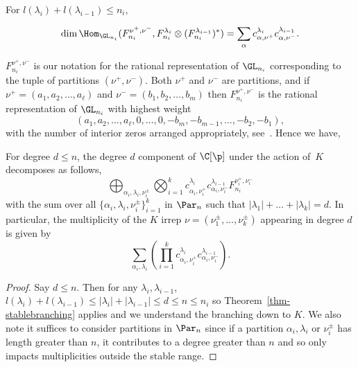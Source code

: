 \begin{thm}  \label{thm-stablebranching}

For $l(\lambda_i) + l(\lambda_{i-1}) \leq n_i$,

$$\dim \Hom_{\GL_{n_i}}(F^{\nu^+, \nu^-}_{n_i}, F^{\lambda_i}_{n_i} \otimes (F^{\lambda_{i-1}}_{n_i})^*) = \sum_\alpha c^{\lambda_i}_{\alpha, \nu^+} c^{\lambda_{i-1}}_{\alpha, \nu^-}.$$


\end{thm}

$F_{n_i}^{\nu^+, \nu^-}$ is our notation for the rational representation of $\GL_{n_i}$ corresponding to the tuple of partitions $(\nu^+, \nu^-)$. Both $\nu^+$ and $\nu^-$ are partitions, and if $\nu^+ = (a_1,a_2,\dots,a_\ell)$ and $\nu^- = (b_1, b_2, \dots, b_m)$ then $F_{n_i}^{\nu^+, \nu^-}$ is the rational representation of $\GL_{n_i}$ with highest weight $$(a_1,a_2,\dots,a_\ell,0,\dots,0,-b_m,-b_{m-1},\dots,-b_2,-b_1),$$ with the number of interior zeros arranged appropriately, see~\cite{STEMBRIDGE198779}. Hence we have,

\begin{thm}
    For degree $d \leq n$, the degree $d$ component of $\C[\p]$ under the action of~$K$ decomposes as follows,
    $$\bigoplus_{\alpha_i, \lambda_i, \nu_i^\pm}\bigotimes_{i=1}^k
    c^{\lambda_i}_{\alpha_i, \nu_i^+} c^{\lambda_{i-1}}_{\alpha_i, \nu_i^-} 
    F^{\nu_i^+, \nu_i^-}_{n_i}$$
    with the sum over all $\{\alpha_i, \lambda_i, \nu_i^\pm\}_{i=1}^k$ in $\Par_n$ such that $|\lambda_1| + \dots + |\lambda_k| = d$. In particular, the multiplicity of the $K$ irrep $\nu = (\nu_1^\pm, \dots , \nu_k^\pm)$ appearing in degree $d$ is given by
    $$\sum_{\alpha_i, \lambda_i} (\prod_{i=1}^k
    c^{\lambda_i}_{\alpha_i, \nu_i^+} c^{\lambda_{i-1}}_{\alpha_i, \nu_i^-}).$$
    
\end{thm}

\begin{proof}
    Say $d \leq n$. Then for any $\lambda_i, \lambda_{i-1}$, $l(\lambda_i) + l(\lambda_{i-1}) \leq |\lambda_i| + |\lambda_{i-1}| \leq d \leq n \leq n_i$ so Theorem~\ref{thm-stablebranching} applies and we understand the branching down to $K$. We also note it suffices to consider partitions in $\Par_n$ since if a partition $\alpha_i, \lambda_i$ or $\nu_i^\pm$ has length greater than $n$, it contributes to a degree greater than $n$ and so only impacts multiplicities outside the stable range.
\end{proof}


